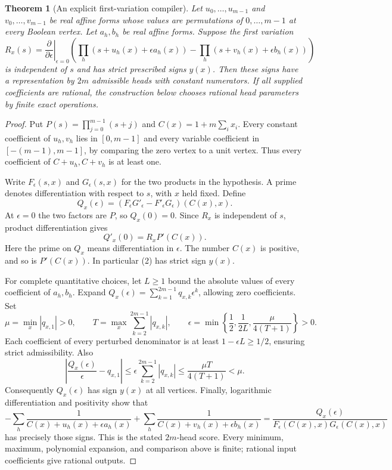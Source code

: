 \documentclass[11pt]{article}
\newtheorem{theorem}{Theorem}
\begin{document}
\begin{theorem}[An explicit first-variation compiler]
Let $u_0,\ldots,u_{m-1}$ and $v_0,\ldots,v_{m-1}$ be real affine
forms whose values are permutations of $0,\ldots,m-1$ at every
Boolean vertex. Let $a_h,b_h$ be real affine forms. Suppose the first
variation
\[
 R_x(s)=\left.\frac{\partial}{\partial\epsilon}\right|_{\epsilon=0}
 \left(\prod_h(s+u_h(x)+\epsilon a_h(x))
       -\prod_h(s+v_h(x)+\epsilon b_h(x))\right)
\]
is independent of $s$ and has strict prescribed signs $y(x)$.
Then these signs have a representation by $2m$ admissible heads with
constant numerators. If all supplied coefficients are rational, the
construction below chooses rational head parameters by finite exact
operations.
\end{theorem}
\begin{proof}
Put $P(s)=\prod_{j=0}^{m-1}(s+j)$ and
$C(x)=1+m\sum_i x_i$. Every constant coefficient of $u_h,v_h$
lies in $[0,m-1]$ and every variable coefficient in
$[-(m-1),m-1]$, by comparing the zero vertex to a unit vertex.
Thus every coefficient of $C+u_h,C+v_h$ is at least one.

Write $F_\epsilon(s,x)$ and $G_\epsilon(s,x)$ for the two products
in the hypothesis. A prime denotes differentiation with respect
to $s$, with $x$ held fixed. Define
\[
 Q_x(\epsilon)=
 (F_\epsilon G'_\epsilon-F'_\epsilon G_\epsilon)(C(x),x).
\]
At $\epsilon=0$ the two factors are $P$, so $Q_x(0)=0$.
Since $R_x$ is independent of $s$, product differentiation gives
\[
 Q'_x(0)=R_x P'(C(x)).
\tag{2}
\]
Here the prime on $Q_x$ means differentiation in $\epsilon$.
The number $C(x)$ is positive, and so is $P'(C(x))$.
In particular (2) has strict sign $y(x)$.

For complete quantitative choices, let $L\ge1$ bound the absolute
values of every coefficient of $a_h,b_h$. Expand
$Q_x(\epsilon)=\sum_{k=1}^{2m-1}q_{x,k}\epsilon^k$,
allowing zero coefficients. Set
\[
 \mu=\min_x|q_{x,1}|>0,
 \qquad T=\max_x\sum_{k=2}^{2m-1}|q_{x,k}|,
 \qquad
 \epsilon=\min\left\{\frac12,\frac1{2L},
                             \frac{\mu}{4(T+1)}\right\}>0.
\]
Each coefficient of every perturbed denominator is at least
$1-\epsilon L\ge1/2$, ensuring strict admissibility.
Also
\[
 \left|\frac{Q_x(\epsilon)}\epsilon-q_{x,1}\right|
       \le\epsilon\sum_{k=2}^{2m-1}|q_{x,k}|
       \le\frac{\mu T}{4(T+1)}<\mu.
\]
Consequently $Q_x(\epsilon)$ has sign $y(x)$ at all vertices.
Finally, logarithmic differentiation and positivity show that
\[
 -\sum_h\frac1{C(x)+u_h(x)+\epsilon a_h(x)}
 +\sum_h\frac1{C(x)+v_h(x)+\epsilon b_h(x)}
   =\frac{Q_x(\epsilon)}
           {F_\epsilon(C(x),x)G_\epsilon(C(x),x)}
\]
has precisely those signs. This is the stated $2m$-head score.
Every minimum, maximum, polynomial expansion, and comparison above
is finite; rational input coefficients give rational outputs.
\end{proof}
\end{document}
